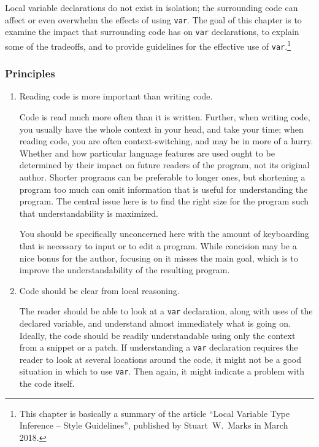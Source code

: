 \documentclass[11pt,a4paper, titlepage, parskip=half, headsepline, footsepline, cleardoublepage=current, headheight=1cm]{scrbook}
\begin{document}
Local variable declarations do not exist in isolation; the surrounding code can affect or even overwhelm the effects of using \lstinline|var|. The goal of this chapter is to examine the impact that surrounding code has on \lstinline|var| declarations, to explain some of the tradeoffs, and to provide guidelines for the effective use of \lstinline|var|.\footnote{This chapter is basically a summary of the article “Local Variable Type Inference – Style Guidelines”, published by Stuart~W.~Marks in March 2018\autocite{Marks:LocalVariableTypeInference}.}

\subsubsection{Principles}
\begin{enumerate}[label=P\arabic*.]
\item{Reading code is more important than writing code.

Code is read much more often than it is written. Further, when writing code, you usually have the whole context in your head, and take your time; when reading code, you are often context-switching, and may be in more of a hurry. Whether and how particular language features are used ought to be determined by their impact on future readers of the program, not its original author. Shorter programs can be preferable to longer ones, but shortening a program too much can omit information that is useful for understanding the program. The central issue here is to find the right size for the program such that understandability is maximized.

You should be specifically unconcerned here with the amount of keyboarding that is necessary to input or to edit a program. While concision may be a nice bonus for the author, focusing on it misses the main goal, which is to improve the understandability of the resulting program.}

\item{Code should be clear from local reasoning.

The reader should be able to look at a \lstinline|var| declaration, along with uses of the declared variable, and understand almost immediately what is going on. Ideally, the code should be readily understandable using only the context from a snippet or a patch. If understanding a \lstinline|var| declaration requires the reader to look at several locations around the code, it might not be a good situation in which to use \lstinline|var|. Then again, it might indicate a problem with the code itself.}


\end{enumerate}
\end{document}
